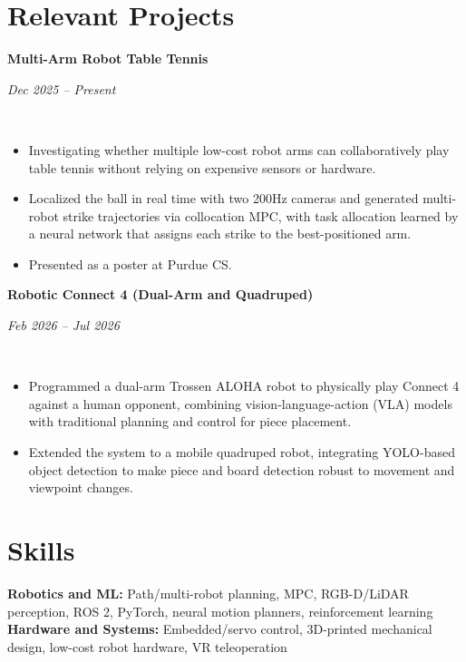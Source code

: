 \documentclass[10pt,letterpaper]{article}
\newcommand{\resumeProject}[2]{%
  \begin{minipage}[t]{0.78\textwidth}\raggedright\textbf{#1}\end{minipage}\hfill
  \begin{minipage}[t]{0.19\textwidth}\raggedleft\textit{#2}\end{minipage}\\[-6pt]
}
\newcommand{\resumeGap}{\vspace{5pt}}
\begin{document}
\section{Relevant Projects}
\resumeProject{Multi-Arm Robot Table Tennis}{Dec 2025 -- Present}
\begin{itemize}
    \item Investigating whether multiple low-cost robot arms can collaboratively play table tennis without relying on expensive sensors or hardware.
    \item Localized the ball in real time with two 200Hz cameras and generated multi-robot strike trajectories via collocation MPC, with task allocation learned by a neural network that assigns each strike to the best-positioned arm.
    \item Presented as a poster at Purdue CS.
\end{itemize}
\resumeGap
\resumeProject{Robotic Connect 4 (Dual-Arm and Quadruped)}{Feb 2026 -- Jul 2026}
\begin{itemize}
    \item Programmed a dual-arm Trossen ALOHA robot to physically play Connect 4 against a human opponent, combining vision-language-action (VLA) models with traditional planning and control for piece placement.
    \item Extended the system to a mobile quadruped robot, integrating YOLO-based object detection to make piece and board detection robust to movement and viewpoint changes.
\end{itemize}
\resumeGap

\section{Skills}
\small
\textbf{Robotics and ML:} Path/multi-robot planning, MPC, RGB-D/LiDAR perception, ROS 2, PyTorch, neural motion planners, reinforcement learning\\
\textbf{Hardware and Systems:} Embedded/servo control, 3D-printed mechanical design, low-cost robot hardware, VR teleoperation
\end{document}
